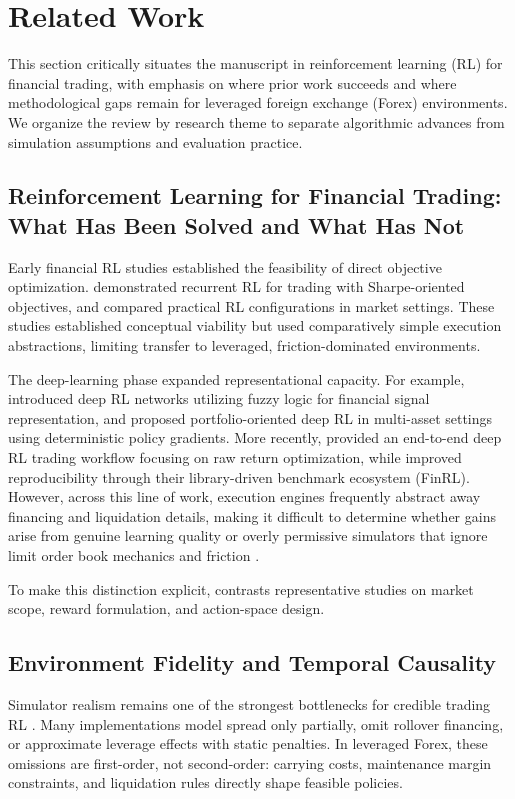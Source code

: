 \section{Related Work}
\label{sec:related_work}

This section critically situates the manuscript in reinforcement learning (RL) for financial trading, with emphasis on where prior work succeeds and where methodological gaps remain for leveraged foreign exchange (Forex) environments. We organize the review by research theme to separate algorithmic advances from simulation assumptions and evaluation practice.

\subsection{Reinforcement Learning for Financial Trading: What Has Been Solved and What Has Not}
Early financial RL studies established the feasibility of direct objective optimization. \citet{moody2001learning} demonstrated recurrent RL for trading with Sharpe-oriented objectives, and \citet{bertoluzzo2012testing} compared practical RL configurations in market settings. These studies established conceptual viability but used comparatively simple execution abstractions, limiting transfer to leveraged, friction-dominated environments.

The deep-learning phase expanded representational capacity. For example, \citet{deng2016deep} introduced deep RL networks utilizing fuzzy logic for financial signal representation, and \citet{jiang2017deep} proposed portfolio-oriented deep RL in multi-asset settings using deterministic policy gradients. More recently, \citet{theate2021application} provided an end-to-end deep RL trading workflow focusing on raw return optimization, while \citet{liu2021finrl} improved reproducibility through their library-driven benchmark ecosystem (FinRL). However, across this line of work, execution engines frequently abstract away financing and liquidation details, making it difficult to determine whether gains arise from genuine learning quality or overly permissive simulators that ignore limit order book mechanics and friction \citep{gould2013limit,zhang2020deep}.

To make this distinction explicit,  contrasts representative studies on market scope, reward formulation, and action-space design.



\subsection{Environment Fidelity and Temporal Causality}
Simulator realism remains one of the strongest bottlenecks for credible trading RL \citep{zhang2020deep}. Many implementations model spread only partially, omit rollover financing, or approximate leverage effects with static penalties. In leveraged Forex, these omissions are first-order, not second-order: carrying costs, maintenance margin constraints, and liquidation rules directly shape feasible policies.

